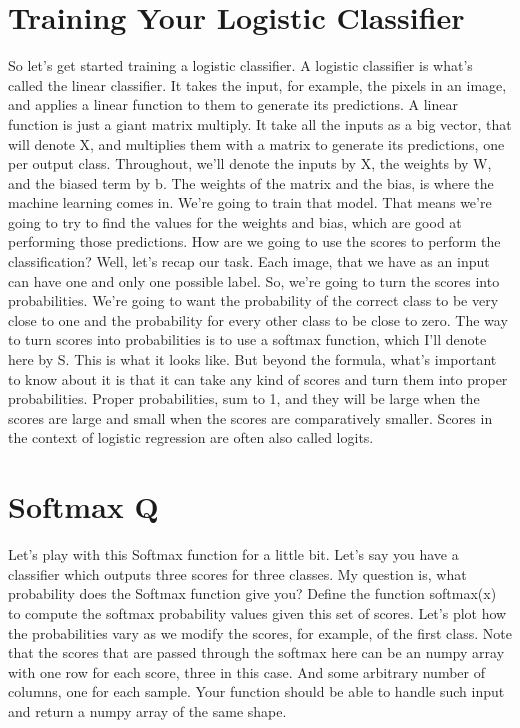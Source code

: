 \documentclass{article}
\begin{document}
\section{Training Your Logistic Classifier}
So let's get started training
a logistic classifier.
A logistic classifier is what's
called the linear classifier.
It takes the input, for example,
the pixels in an image, and
applies a linear function to them
to generate its predictions.
A linear function is just
a giant matrix multiply.
It take all the inputs as a big vector,
that will denote X, and multiplies
them with a matrix to generate its
predictions, one per output class.
Throughout, we'll denote the inputs
by X, the weights by W, and
the biased term by b.
The weights of the matrix and the bias,
is where the machine learning comes in.
We're going to train that model.
That means we're going to try to
find the values for the weights and
bias, which are good at
performing those predictions.
How are we going to use the scores
to perform the classification?
Well, let's recap our task.
Each image, that we have as an input can
have one and only one possible label.
So, we're going to turn
the scores into probabilities.
We're going to want the probability of
the correct class to be very close to
one and the probability for
every other class to be close to zero.
The way to turn scores
into probabilities is to
use a softmax function,
which I'll denote here by S.
This is what it looks like.
But beyond the formula,
what's important to know about it
is that it can take any kind of scores
and turn them into proper probabilities.
Proper probabilities, sum to 1,
and they will be large
when the scores are large and small when
the scores are comparatively smaller.
Scores in the context of logistic
regression are often also called logits.
\section{Softmax Q}
Let's play with this Softmax
function for a little bit.
Let's say you have a classifier which
outputs three scores for three classes.
My question is, what probability
does the Softmax function give you?
Define the function softmax(x) to
compute the softmax probability values
given this set of scores.
Let's plot how the probabilities
vary as we modify the scores,
for example, of the first class.
Note that the scores that
are passed through the softmax here
can be an numpy array with one row for
each score, three in this case.
And some arbitrary number of columns,
one for each sample.
Your function should be able
to handle such input and
return a numpy array of the same shape.
\end{document}
